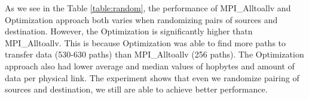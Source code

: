 

As we see in the Table \ref{table:random}, the performance of MPI\_Alltoallv and Optimization approach both varies when randomizing pairs of sources and destination. However, the Optimization is significantly higher thatn MPI\_Alltoallv. This is because Optimization was able to find more paths to transfer data (530-630 paths) than MPI\_Alltoallv (256 paths). The Optimization approach also had lower average and median values of hopbytes and amount of data per physical link. The experiment shows that even we randomize pairing of sources and destination, we still are able to achieve better performance.
